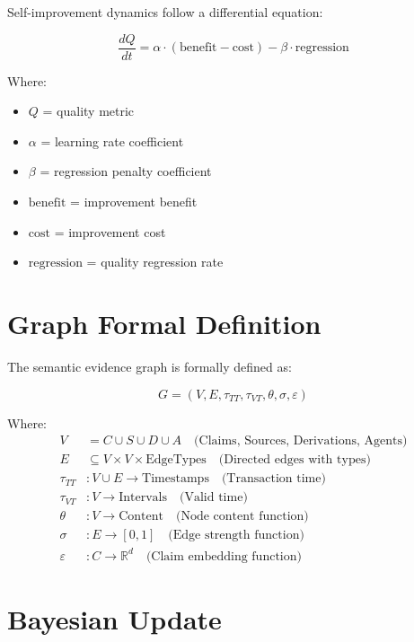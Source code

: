 Self-improvement dynamics follow a differential equation:

\begin{equation}
\frac{dQ}{dt} = \alpha \cdot (\text{benefit} - \text{cost}) - \beta \cdot \text{regression}
\end{equation}

Where:
\begin{itemize}
    \item $Q$ = quality metric
    \item $\alpha$ = learning rate coefficient
    \item $\beta$ = regression penalty coefficient
    \item $\text{benefit}$ = improvement benefit
    \item $\text{cost}$ = improvement cost
    \item $\text{regression}$ = quality regression rate
\end{itemize}

\section{Graph Formal Definition}

The semantic evidence graph is formally defined as:

\begin{equation}
G = (V, E, \tau_{TT}, \tau_{VT}, \theta, \sigma, \varepsilon)
\end{equation}

Where:
\begin{align}
V &= C \cup S \cup D \cup A \quad \text{(Claims, Sources, Derivations, Agents)} \\
E &\subseteq V \times V \times \text{EdgeTypes} \quad \text{(Directed edges with types)} \\
\tau_{TT} &: V \cup E \to \text{Timestamps} \quad \text{(Transaction time)} \\
\tau_{VT} &: V \to \text{Intervals} \quad \text{(Valid time)} \\
\theta &: V \to \text{Content} \quad \text{(Node content function)} \\
\sigma &: E \to [0, 1] \quad \text{(Edge strength function)} \\
\varepsilon &: C \to \mathbb{R}^d \quad \text{(Claim embedding function)}
\end{align}

\section{Bayesian Update}

